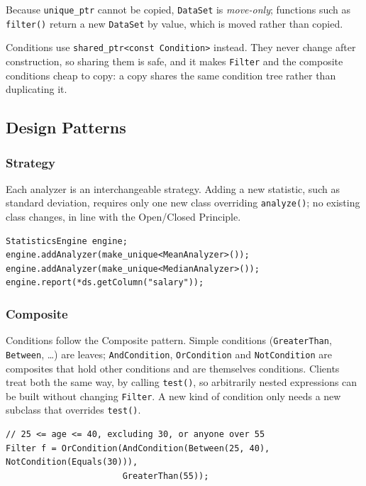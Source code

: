 \documentclass[11pt,a4paper]{article}
\newcommand{\code}[1]{\texttt{#1}}
\begin{document}
Because \code{unique\_ptr} cannot be copied, \code{DataSet} is \emph{move-only}; functions such as
\code{filter()} return a new \code{DataSet} by value, which is moved rather than copied.

Conditions use \code{shared\_ptr<const Condition>} instead. They never change after construction,
so sharing them is safe, and it makes \code{Filter} and the composite conditions cheap to copy: a
copy shares the same condition tree rather than duplicating it.

\subsection{Design Patterns}

\subsubsection*{Strategy}

Each analyzer is an interchangeable strategy. Adding a new statistic, such as standard deviation,
requires only one new class overriding \code{analyze()}; no existing class changes, in line with
the Open/Closed Principle.

\begin{lstlisting}
StatisticsEngine engine;
engine.addAnalyzer(make_unique<MeanAnalyzer>());
engine.addAnalyzer(make_unique<MedianAnalyzer>());
engine.report(*ds.getColumn("salary"));
\end{lstlisting}

\subsubsection*{Composite}
\label{sec:composite}

Conditions follow the Composite pattern. Simple conditions (\code{GreaterThan}, \code{Between},
\ldots) are leaves; \code{AndCondition}, \code{OrCondition} and \code{NotCondition} are composites
that hold other conditions and are themselves conditions. Clients treat both the same way, by
calling \code{test()}, so arbitrarily nested expressions can be built without changing
\code{Filter}. A new kind of condition only needs a new subclass that overrides \code{test()}.

\begin{lstlisting}
// 25 <= age <= 40, excluding 30, or anyone over 55
Filter f = OrCondition(AndCondition(Between(25, 40), NotCondition(Equals(30))),
                       GreaterThan(55));
\end{lstlisting}
\end{document}
